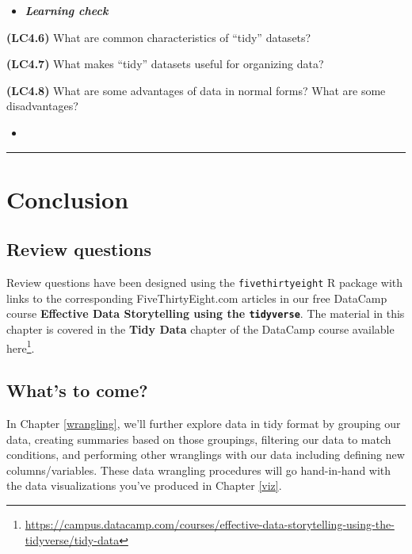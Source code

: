 \documentclass[12pt,]{krantz}
\renewcommand{\href}[2]{#2\footnote{\url{#1}}}
\newenvironment{rmdblock}[1]
  {\begin{shaded*}
  \begin{itemize}
  \renewcommand{\labelitemi}{
    \raisebox{-.7\height}[0pt][0pt]{
    }
  }
  \item
  }
  {
  \end{itemize}
  \end{shaded*}
  }
\newenvironment{learncheck}
  {\begin{rmdblock}{warning}}
  {\end{rmdblock}}
\begin{document}
\begin{learncheck}
\textbf{\emph{Learning check}}
\end{learncheck}

\textbf{(LC4.6)} What are common characteristics of ``tidy'' datasets?

\textbf{(LC4.7)} What makes ``tidy'' datasets useful for organizing
data?

\textbf{(LC4.8)} What are some advantages of data in normal forms? What
are some disadvantages?

\begin{learncheck}

\end{learncheck}

\begin{center}\rule{0.5\linewidth}{\linethickness}\end{center}

\section{Conclusion}\label{conclusion-2}

\subsection{Review questions}\label{review-questions-1}

Review questions have been designed using the \texttt{fivethirtyeight} R
package \citep{R-fivethirtyeight} with links to the corresponding
FiveThirtyEight.com articles in our free DataCamp course
\textbf{Effective Data Storytelling using the \texttt{tidyverse}}. The
material in this chapter is covered in the \textbf{Tidy Data} chapter of
the DataCamp course available
\href{https://campus.datacamp.com/courses/effective-data-storytelling-using-the-tidyverse/tidy-data}{here}.

\subsection{What's to come?}\label{whats-to-come-2}

In Chapter \ref{wrangling}, we'll further explore data in tidy format by
grouping our data, creating summaries based on those groupings,
filtering our data to match conditions, and performing other wranglings
with our data including defining new columns/variables. These data
wrangling procedures will go hand-in-hand with the data visualizations
you've produced in Chapter \ref{viz}.
\end{document}

